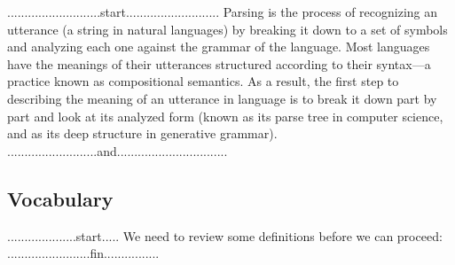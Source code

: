 ...........................start...........................
Parsing is the process of recognizing an utterance (a string in natural languages) by breaking it down to a set of symbols and analyzing each one against the grammar of the language. Most languages have the meanings of their utterances structured according to their syntax—a practice known as compositional semantics. As a result, the first step to describing the meaning of an utterance in language is to break it down part by part and look at its analyzed form (known as its parse tree in computer science, and as its deep structure in generative grammar).
..........................and................................

\subsection{Vocabulary}
....................start.....
We need to review some definitions before we can proceed:\\
........................fin................

